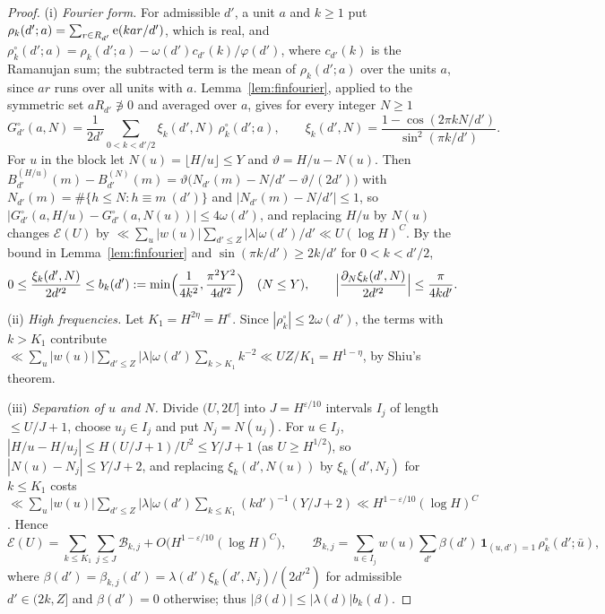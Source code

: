 \documentclass[11pt,a4paper]{article}
\theoremstyle{remark}\newtheorem{remark}[theorem]{Remark}
\begin{document}
\begin{proof}
(i) \emph{Fourier form.} For admissible $d'$, a unit $a$ and $k\ge1$ put $\rho_k(d';a)=\sum_{r\in R_{d'}}\mathrm{e}(kar/d')$, which is real,
and $\rho^\circ_k(d';a)=\rho_k(d';a)-\omega(d')c_{d'}(k)/\varphi(d')$, where $c_{d'}(k)$ is the Ramanujan sum; the subtracted term is the
mean of $\rho_k(d';a)$ over the units $a$, since $ar$ runs over all units with $a$. Lemma~\ref{lem:finfourier}, applied to the
symmetric set $aR_{d'}\not\ni0$ and averaged over $a$, gives for every integer $N\ge1$
\[
G^\circ_{d'}(a,N)=\frac1{2d'}\sum_{0<k<d'/2}\xi_k(d',N)\,\rho^\circ_k(d';a),\qquad\xi_k(d',N)=\frac{1-\cos(2\pi kN/d')}{\sin^2(\pi k/d')}.
\]
For $u$ in the block let $N(u)=\lfloor H/u\rfloor\le Y$ and $\vartheta=H/u-N(u)$. Then
$B^{(H/u)}_{d'}(m)-B^{(N)}_{d'}(m)=\vartheta\bigl(N_{d'}(m)-N/d'-\vartheta/(2d')\bigr)$ with $N_{d'}(m)=\#\{h\le N:h\equiv m\ (d')\}$ and
$|N_{d'}(m)-N/d'|\le1$, so $|G^\circ_{d'}(a,H/u)-G^\circ_{d'}(a,N(u))|\le4\omega(d')$, and replacing $H/u$ by $N(u)$ changes
$\mathcal E(U)$ by $\ll\sum_u|w(u)|\sum_{d'\le Z}|\lambda|\omega(d')/d'\ll U(\log H)^C$. By the bound in Lemma~\ref{lem:finfourier} and
$\sin(\pi k/d')\ge2k/d'$ for $0<k<d'/2$,
\[
0\le\frac{\xi_k(d',N)}{2d'^2}\le b_k(d'):=\min\Bigl(\frac1{4k^2},\frac{\pi^2Y^2}{4d'^2}\Bigr)\quad(N\le Y),\qquad
\Bigl|\frac{\partial_N\xi_k(d',N)}{2d'^2}\Bigr|\le\frac{\pi}{4kd'} .
\]

(ii) \emph{High frequencies.} Let $K_1=H^{2\eta}=H^{\varepsilon}$. Since $|\rho^\circ_k|\le2\omega(d')$, the terms with $k>K_1$ contribute
$\ll\sum_u|w(u)|\sum_{d'\le Z}|\lambda|\omega(d')\sum_{k>K_1}k^{-2}\ll UZ/K_1=H^{1-\eta}$, by Shiu's theorem.

(iii) \emph{Separation of $u$ and $N$.} Divide $(U,2U]$ into $J=H^{\varepsilon/10}$ intervals $I_j$ of length $\le U/J+1$, choose
$u_j\in I_j$ and put $N_j=N(u_j)$. For $u\in I_j$, $|H/u-H/u_j|\le H(U/J+1)/U^2\le Y/J+1$ (as $U\ge H^{1/2}$), so $|N(u)-N_j|\le Y/J+2$,
and replacing $\xi_k(d',N(u))$ by $\xi_k(d',N_j)$ for $k\le K_1$ costs
$\ll\sum_u|w(u)|\sum_{d'\le Z}|\lambda|\omega(d')\sum_{k\le K_1}(kd')^{-1}(Y/J+2)\ll H^{1-\varepsilon/10}(\log H)^C$. Hence
\[
\mathcal E(U)=\sum_{k\le K_1}\sum_{j\le J}\mathcal B_{k,j}+O\bigl(H^{1-\varepsilon/10}(\log H)^C\bigr),\qquad
\mathcal B_{k,j}=\sum_{u\in I_j}w(u)\sum_{d'}\beta(d')\,\mathbf 1_{(u,d')=1}\,\rho^\circ_k(d';\bar u),
\]
where $\beta(d')=\beta_{k,j}(d')=\lambda(d')\xi_k(d',N_j)/(2d'^2)$ for admissible $d'\in(2k,Z]$ and $\beta(d')=0$ otherwise; thus
$|\beta(d)|\le|\lambda(d)|b_k(d)$.


\end{proof}
\end{document}

